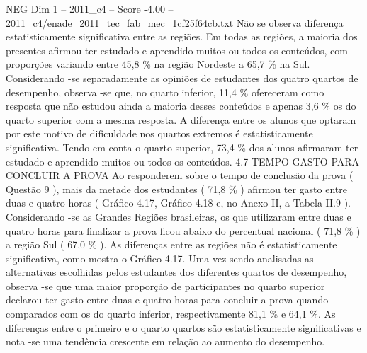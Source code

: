 \begin{textsample}{NEG Dim 1 – 2011\_c4 – Score -4.00 – 2011\_c4/enade\_2011\_tec\_fab\_mec\_1cf25f64cb.txt}
Não se observa diferença estatisticamente significativa entre as regiões.
Em todas as regiões, a maioria dos presentes afirmou ter estudado e aprendido muitos ou todos os conteúdos, com proporções variando entre 45,8 \% na região Nordeste a 65,7 \% na Sul.
Considerando -se separadamente as opiniões de estudantes dos quatro quartos de desempenho, observa -se que, no quarto inferior, 11,4 \% ofereceram como resposta que não estudou ainda a maioria desses conteúdos e apenas 3,6 \% os do quarto superior com a mesma resposta.
A diferença entre os alunos que optaram por este motivo de dificuldade nos quartos extremos é estatisticamente significativa.
Tendo em conta o quarto superior, 73,4 \% dos alunos afirmaram ter estudado e aprendido muitos ou todos os conteúdos. 4.7 TEMPO GASTO PARA CONCLUIR A PROVA Ao responderem sobre o tempo de conclusão da prova ( Questão 9 ), mais da metade dos estudantes ( 71,8 \% ) afirmou ter gasto entre duas e quatro horas ( Gráfico 4.17, Gráfico 4.18 e, no Anexo II, a Tabela II.9 ).
Considerando -se as Grandes Regiões brasileiras, os que utilizaram entre duas e quatro horas para finalizar a prova ficou abaixo do percentual nacional ( 71,8 \% ) a região Sul ( 67,0 \% ).
As diferenças entre as regiões não é estatisticamente significativa, como mostra o Gráfico 4.17.
Uma vez sendo analisadas as alternativas escolhidas pelos estudantes dos diferentes quartos de desempenho, observa -se que uma maior proporção de participantes no quarto superior declarou ter gasto entre duas e quatro horas para concluir a prova quando comparados com os do quarto inferior, respectivamente 81,1 \% e 64,1 \%.
As diferenças entre o primeiro e o quarto quartos são estatisticamente significativas e nota -se uma tendência crescente em relação ao aumento do desempenho.

\end{textsample}
